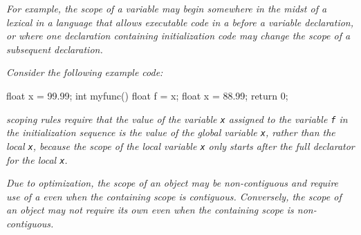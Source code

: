 \textit{For example, the scope of a variable may begin somewhere 
in the midst of a lexical  in a 
language that allows executable code in a
 before a variable declaration, or where one declaration
containing initialization code may change the scope of a
subsequent declaration.}  

\textit{Consider the following example  code:}
\par %
\begin{nlnlisting}
float x = 99.99;
int myfunc()
{
    float f = x;
    float x = 88.99;
    return 0;
}
\end{nlnlisting}

\textit{ scoping rules require that the value of the 
variable \texttt{x} assigned to the variable \texttt{f} in the 
initialization sequence is the value of the global variable \texttt{x}, 
rather than the local \texttt{x}, because the scope of the local variable 
\texttt{x} only starts after the full declarator for the local \texttt{x}.}

\textit{Due to optimization, the scope of an object may be
non-contiguous and require use of a  even when
the containing scope is contiguous. Conversely, the scope of
an object may not require its own  even when the
containing scope is non-contiguous.}
